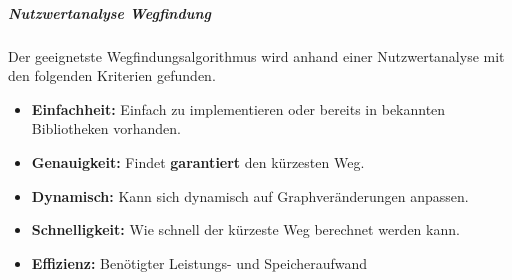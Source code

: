 \documentclass[../main.tex]{subfiles}
\begin{document}
\subparagraph{Nutzwertanalyse Wegfindung}

Der geeignetste Wegfindungsalgorithmus wird anhand einer Nutzwertanalyse mit den folgenden Kriterien gefunden.

\begin{itemize}
    \item \textbf{Einfachheit:} Einfach zu implementieren oder bereits in bekannten Bibliotheken vorhanden.
    \item \textbf{Genauigkeit:} Findet \textbf{garantiert} den kürzesten Weg.
    \item \textbf{Dynamisch:} Kann sich dynamisch auf Graphveränderungen anpassen.
    \item \textbf{Schnelligkeit:} Wie schnell der kürzeste Weg berechnet werden kann.
    \item \textbf{Effizienz:} Benötigter Leistungs- und Speicheraufwand
\end{itemize}

\begin{table}[H]
    \caption{Nutzwertanalyse Wegfindung}
    \label{tab:nutzwertanalyse_wegfindung}
\end{table}
\end{document}

